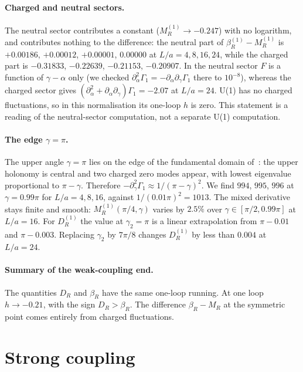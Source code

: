 \documentclass[11pt,a4paper]{article}
\theoremstyle{definition}
\theoremstyle{remark}
\newcommand{\bR}{\beta_R}
\newcommand{\DR}{D_R}
\begin{document}
\paragraph{Charged and neutral sectors.} The neutral sector contributes a constant ($M_R^{(1)}\to-0.247$) with no logarithm, and contributes nothing to the difference: the neutral part of $\bR^{(1)}-M_R^{(1)}$ is $+0.00186$, $+0.00012$, $+0.00001$, $0.00000$ at $L/a=4,8,16,24$, while the charged part is $-0.31833$, $-0.22639$, $-0.21153$, $-0.20907$. In the neutral sector $F$ is a function of $\gamma-\alpha$ only (we checked $\partial_\alpha^2\Gamma_1=-\partial_\alpha\partial_\gamma\Gamma_1$ there to $10^{-8}$), whereas the charged sector gives $(\partial_\alpha^2+\partial_\alpha\partial_\gamma)\Gamma_1=-2.07$ at $L/a=24$. U(1) has no charged fluctuations, so in this normalisation its one-loop $h$ is zero. This statement is a reading of the neutral-sector computation, not a separate U(1) computation.

\paragraph{The edge $\gamma=\pi$.} The upper angle $\gamma=\pi$ lies on the edge of the fundamental domain of~\cite[(5.8)]{LNWW}: the upper holonomy is central and two charged zero modes appear, with lowest eigenvalue proportional to $\pi-\gamma$. Therefore $-\partial_\gamma^2\Gamma_1\approx1/(\pi-\gamma)^2$. We find $994$, $995$, $996$ at $\gamma=0.99\pi$ for $L/a=4,8,16$, against $1/(0.01\pi)^2=1013$. The mixed derivative stays finite and smooth: $M_R^{(1)}(\pi/4,\gamma)$ varies by $2.5\%$ over $\gamma\in[\pi/2,0.99\pi]$ at $L/a=16$. For $\DR^{(1)}$ the value at $\gamma_2=\pi$ is a linear extrapolation from $\pi-0.01$ and $\pi-0.003$. Replacing $\gamma_2$ by $7\pi/8$ changes $\DR^{(1)}$ by less than $0.004$ at $L/a=24$.

\paragraph{Summary of the weak-coupling end.} The quantities $\DR$ and $\bR$ have the same one-loop running. At one loop $h\to-0.21$, with the sign $\DR>\bR$. The difference $\bR-M_R$ at the symmetric point comes entirely from charged fluctuations.

\section{Strong coupling}\label{sec:strong}
\end{document}
